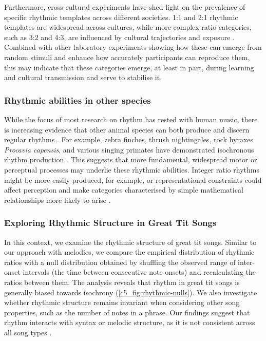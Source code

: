 Furthermore, cross-cultural experiments have shed light on the prevalence of specific rhythmic templates across different societies. 1:1 and 2:1 rhythmic templates are widespread across cultures, while more complex ratio categories, such as 3:2 and 4:3, are influenced by cultural trajectories and exposure \autocite{polak2018, jacoby2017a, jacoby2021}. Combined with other laboratory experiments \autocite{ravignani2017a} showing how these can emerge from random stimuli and enhance how accurately participants can reproduce them, this may indicate that these categories emerge, at least in part, during learning and cultural transmission and serve to stabilise it.

\subsubsection{Rhythmic abilities in other species}
While the focus of most research on rhythm has rested with human music, there is increasing evidence that other animal species can both produce and discern regular rhythms \autocite{rouse2021, verga2022, vanderaa2015}. For example, zebra finches, thrush nightingales, rock hyraxes \textit{Procavia capensis}, and various singing primates have demonstrated isochronous rhythm production \autocite{roeske2020, norton2016, demartsev2023, degregorio2021, degregorio2023, raimondi2023}. This suggests that more fundamental, widespread motor or perceptual processes may underlie these rhythmic abilities. Integer ratio rhythms might be more easily produced, for example, or representational constraints could affect perception and make categories characterised by simple mathematical relationships more likely to arise \autocite{ravignani2018c, roeske2020, jacoby2017a}.


\subsubsection{Exploring Rhythmic Structure in Great Tit Songs}

In this context, we examine the rhythmic structure of great tit songs. Similar to our approach with melodies, we compare the empirical distribution of rhythmic ratios with a null distribution obtained by shuffling the observed range of inter-onset intervals (the time between consecutive note onsets) and recalculating the ratios between them. The analysis reveals that rhythm in great tit songs is generally biased towards isochrony (\autoref{c5_fig:rhythmic-nulls}). We also investigate whether rhythmic structure remains invariant when considering other song properties, such as the number of notes in a phrase. Our findings suggest that rhythm interacts with syntax or melodic structure, as it is not consistent across all song types \autocite{xing2022}.

